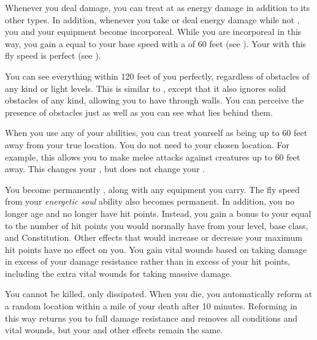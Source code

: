              Whenever you deal damage, you can treat at as energy damage in addition to its other types.
            In addition, whenever you take or deal energy damage while not , you and your equipment  become incorporeal.
            While you are incorporeal in this way, you gain a  equal to your base speed with a  of 60 feet (see ).
            Your  with this fly speed is perfect (see ).

             You can see everything within 120 feet of you perfectly, regardless of obstacles of any kind or light levels.
            This is similar to , except that it also ignores solid obstacles of any kind, allowing you to have  through walls.
            You can perceive the presence of obstacles just as well as you can see what lies behind them.

             When you use any of your abilities, you can treat yourself as being up to 60 feet away from your true location.
            You do not need  to your chosen location.
            For example, this allows you to make melee attacks against creatures up to 60 feet away.
            This changes your , but does not change your .

             You become permanently , along with any equipment you carry.
            The fly speed from your \textit{energetic soul} ability also becomes permanent.
            In addition, you no longer age and no longer have hit points.
            Instead, you gain a bonus to your  equal to the number of hit points you would normally have from your level, base class, and Constitution.
            Other effects that would increase or decrease your maximum hit points have no effect on you.
            You gain vital wounds based on taking damage in excess of your damage resistance rather than in excess of your hit points, including the extra vital wounds for taking massive damage.

             You cannot be killed, only dissipated.
            When you die, you automatically reform at a random location within a mile of your death after 10 minutes.
            Reforming in this way returns you to full damage resistance and removes all conditions and vital wounds, but your  and other effects remain the same.

